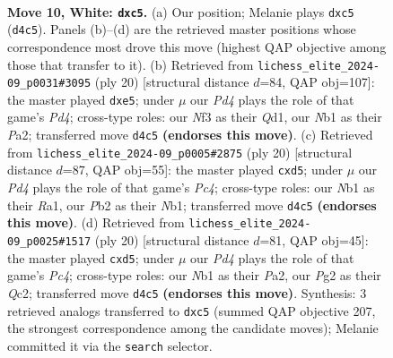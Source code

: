 \documentclass[11pt]{article}
\begin{document}
\clearpage

\begin{figure}[p]\centering
\begin{subfigure}{0.46\textwidth}\centering
\resizebox{\linewidth}{!}{%
\newchessgame
\chessboard[
  setfen={r1bq1rk1/p2n1ppp/1p2pn2/2pp4/3P4/2PBPNP1/PP4PP/RN1Q1RK1 w - - 1 10},
  showmover=false,
  pgfstyle=straightmove, color=movearrow, markmove={d4-c5}
]}
\caption{}
\end{subfigure}\hfill
\begin{subfigure}{0.46\textwidth}\centering
\resizebox{\linewidth}{!}{%
\newchessgame
\chessboard[
  setfen={r1b2rk1/ppqn1ppp/5n2/2ppp3/3P4/2PBPNP1/PP1N1PP1/R2Q1RK1 w - - 0 11},
  showmover=false,
  pgfstyle=straightmove, color=movearrow, markmove={d4-e5}
]}
\caption{}
\end{subfigure}
\\[4pt]
\begin{subfigure}{0.46\textwidth}\centering
\resizebox{\linewidth}{!}{%
\newchessgame
\chessboard[
  setfen={2rq1rk1/p1pn1ppp/bp2pn2/3p4/2PP4/1P3NP1/P2QPPBP/RNR3K1 w - - 4 11},
  showmover=false,
  pgfstyle=straightmove, color=movearrow, markmove={c4-d5}
]}
\caption{}
\end{subfigure}\hfill
\begin{subfigure}{0.46\textwidth}\centering
\resizebox{\linewidth}{!}{%
\newchessgame
\chessboard[
  setfen={r1bq1rk1/p2n1pp1/1pp1pn1p/3p4/2PP4/4PNP1/PPQNBPP1/R3K2R w KQ - 0 11},
  showmover=false,
  pgfstyle=straightmove, color=movearrow, markmove={c4-d5}
]}
\caption{}
\end{subfigure}
\caption{\textbf{Move 10, White: \texttt{dxc5}.} (a) Our position; Melanie plays \texttt{dxc5} (\texttt{d4c5}). Panels (b)--(d) are the retrieved master positions whose correspondence most drove this move (highest QAP objective among those that transfer to it). (b) Retrieved from \texttt{lichess\_elite\_2024-09\_p0031\#3095} (ply 20) [structural distance $d$=84, QAP obj=107]: the master played \texttt{dxe5}; under $\mu$ our \emph{Pd4} plays the role of that game's \emph{Pd4}; cross-type roles: our \emph{N}f3 as their \emph{Q}d1, our \emph{N}b1 as their \emph{P}a2; transferred move \texttt{d4c5} \textbf{(endorses this move)}. (c) Retrieved from \texttt{lichess\_elite\_2024-09\_p0005\#2875} (ply 20) [structural distance $d$=87, QAP obj=55]: the master played \texttt{cxd5}; under $\mu$ our \emph{Pd4} plays the role of that game's \emph{Pc4}; cross-type roles: our \emph{N}b1 as their \emph{R}a1, our \emph{P}b2 as their \emph{N}b1; transferred move \texttt{d4c5} \textbf{(endorses this move)}. (d) Retrieved from \texttt{lichess\_elite\_2024-09\_p0025\#1517} (ply 20) [structural distance $d$=81, QAP obj=45]: the master played \texttt{cxd5}; under $\mu$ our \emph{Pd4} plays the role of that game's \emph{Pc4}; cross-type roles: our \emph{N}b1 as their \emph{P}a2, our \emph{P}g2 as their \emph{Q}c2; transferred move \texttt{d4c5} \textbf{(endorses this move)}. Synthesis: 3 retrieved analogs transferred to \texttt{dxc5} (summed QAP objective 207, the strongest correspondence among the candidate moves); Melanie committed it via the \texttt{search} selector.}
\label{fig:thought-m18}
\end{figure}
\end{document}
